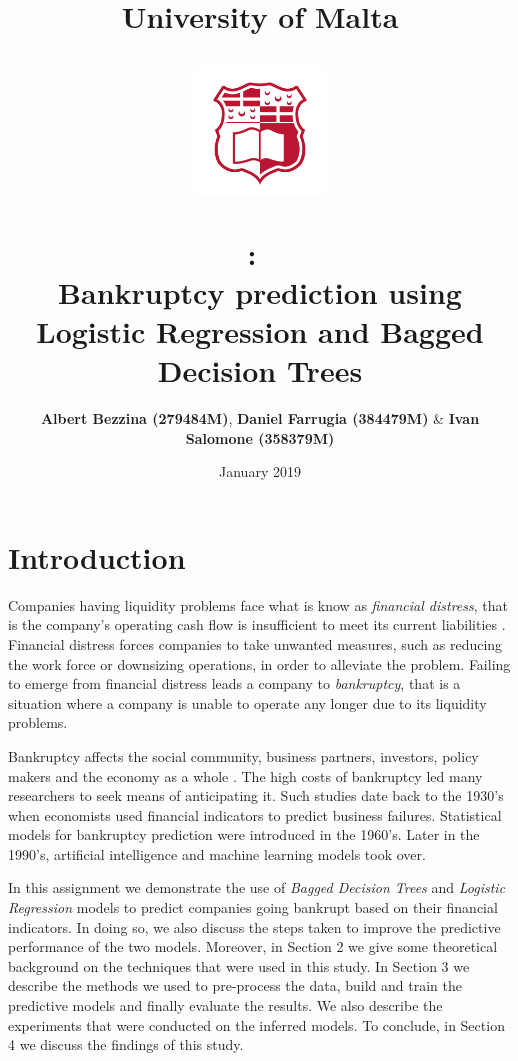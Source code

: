 \documentclass{article}[paper=a4,pagesize=auto,10pt]
\title{
\textmd{\textbf{University of Malta}}\\
\includegraphics[width=3.5cm,height=5cm,keepaspectratio]{graphics/umlogo_red.png}\\
\vspace{2.0in}
\textmd{\textbf{\hmwkClass:\ \hmwkTitle}}\\
\vspace{0.1in}Bankruptcy prediction using Logistic Regression and Bagged Decision Trees\\
\vspace{2.0in}
}
\author{\textbf{Albert Bezzina (279484M)}, \textbf{Daniel Farrugia (384479M)} \& \textbf{Ivan Salomone (358379M)}}
\date{January 2019} %
\begin{document}
\maketitle
\thispagestyle{empty}


\newpage
\tableofcontents
\thispagestyle{empty}
\newpage
{}


\section{Introduction}
\label{Introduction}

Companies having liquidity problems face what is know as \textit{financial distress}, that is the company’s operating cash flow is insufficient to meet its current liabilities \cite{tasman}. Financial distress forces companies to take unwanted measures, such as reducing the work force or downsizing operations, in order to alleviate the problem. Failing to emerge from financial distress leads a company to \textit{bankruptcy}, that is a situation where a company is unable to operate any longer due to its liquidity problems.\medskip

Bankruptcy affects the social community, business partners, investors, policy makers and the economy as a whole \cite{zikeba2016ensemble}. The high costs of bankruptcy led many researchers to seek means of anticipating it. Such studies date back to the 1930's when economists used financial indicators to predict business failures. Statistical models for bankruptcy prediction were introduced in the 1960's. Later in the 1990's, artificial intelligence and machine learning models took over.\medskip

In this assignment we demonstrate the use of \textit{Bagged Decision Trees} and \textit{Logistic Regression} models to predict companies going bankrupt based on their financial indicators. In doing so, we also discuss the steps taken to improve the predictive performance of the two models. Moreover, in Section 2 we give some theoretical background on the techniques that were used in this study. In Section 3 we describe the methods we used to pre-process the data, build and train the predictive models and finally evaluate the results. We also describe the experiments that were conducted on the inferred models. To conclude, in Section 4 we discuss the findings of this study.
\end{document}
